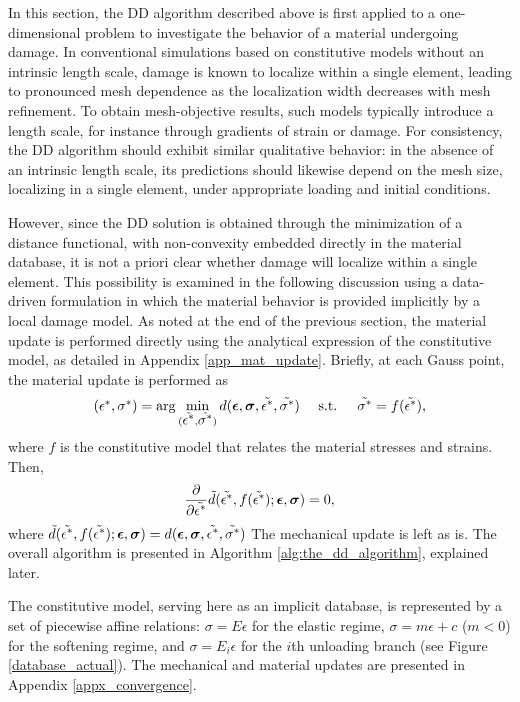 \documentclass[10pt]{cas-sc}
\newenvironment{deletedblock}
{\begin{tcbstrikeout}\color{red}}
	{\end{tcbstrikeout}}
\begin{document}
\begin{deletedblock}
	
	In this section, the DD algorithm described above is first applied to a one-dimensional problem to investigate the behavior of a material undergoing damage. In conventional simulations based on constitutive models without an intrinsic length scale, damage is known to localize within a single element, leading to pronounced mesh dependence as the localization width decreases with mesh refinement. To obtain mesh-objective results, such models typically introduce a length scale, for instance through gradients of strain or damage. For consistency, the DD algorithm should exhibit similar qualitative behavior: in the absence of an intrinsic length scale, its predictions should likewise depend on the mesh size, localizing in a single element, under appropriate loading and initial conditions.
	
	However, since the DD solution is obtained through the minimization of a distance functional, with non-convexity embedded directly in the material database, it is not a priori clear whether damage will localize within a single element. This possibility is examined in the following discussion using a data-driven formulation in which the material behavior is provided implicitly by a local damage model. As noted at the end of the previous section, the material update is performed directly using the analytical expression of the constitutive model, as detailed in Appendix \ref{app_mat_update}. Briefly, at each Gauss point, the material update is performed as
	\begin{equation}
		(\mbox{$\epsilon^*$},\mbox{$\sigma^*$}) = \arg \min_{(\tilde{\mbox{$\epsilon^*$}},\tilde{\mbox{$\sigma^*$}})} d(\mbox{\boldmath $\epsilon$},\mbox{\boldmath $\sigma$},\tilde{\mbox{$\epsilon^*$}},\tilde{\mbox{$\sigma^*$}}) \quad \text{   s.t.   }\quad \tilde{\mbox{$\sigma^*$}}=f(\tilde{\mbox{$\epsilon^*$}}),
	\end{equation}
	where $f$ is the constitutive model that relates the material stresses and strains. Then,
	\begin{equation}
		{\dfrac{\partial }{\partial \tilde{ \mbox{$\epsilon^*$}}}} \tilde{d}(\tilde{\mbox{$\epsilon^*$}},f(\tilde{\mbox{$\epsilon^*$}});\mbox{\boldmath $\epsilon$},\mbox{\boldmath $\sigma$}  )    =0,
	\end{equation}
	where $ \tilde{d}(\tilde{\mbox{$\epsilon^*$}},f(\tilde{\mbox{$\epsilon^*$}});\mbox{\boldmath $\epsilon$},\mbox{\boldmath $\sigma$} )  = d(\mbox{\boldmath $\epsilon$},\mbox{\boldmath $\sigma$},\tilde{\mbox{$\epsilon^*$}},\tilde{\mbox{$\sigma^*$}})$
	The mechanical update is left as is. The overall algorithm is presented in Algorithm \ref{alg:the_dd_algorithm}, explained later.
	
	The constitutive model, serving here as an implicit database, is represented by a set of piecewise affine relations: $\sigma = E\epsilon$ for the elastic regime, $\sigma = m\epsilon + c$ ($m<0$) for the softening regime, and $\sigma = E_i \epsilon$ for the $i$th unloading branch (see Figure \ref{database_actual}). The mechanical and material updates are presented in Appendix \ref{appx_convergence}.
	

\end{deletedblock}
\end{document}
